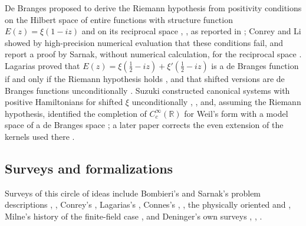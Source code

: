\documentclass[11pt]{amsart}
\theoremstyle{plain}
\theoremstyle{definition}
\theoremstyle{remark}
\numberwithin{equation}{section}
\newcommand{\R}{\mathbb{R}}
\begin{document}
De Branges proposed to derive the Riemann hypothesis from positivity
conditions on the Hilbert space of entire functions with structure
function $E(z)=\xi(1-iz)$ and on its reciprocal space
\cite{DeBranges1986RHHilbert}, \cite{DeBranges1992Euler}, as reported in
\cite[Theorem~2, p.~4]{ConreyLi2000Positivity}; Conrey and Li showed by
high-precision numerical evaluation that these conditions fail, and
report a proof by Sarnak, without numerical calculation, for the
reciprocal space \cite[(3.2) and~(3.4), pp.~6--7, and Remark, p.~9]%
{ConreyLi2000Positivity}. Lagarias proved that
$E(z)=\xi(\tfrac12-iz)+\xi'(\tfrac12-iz)$ is a de Branges function if
and only if the Riemann hypothesis holds
\cite[Theorem~1, p.~9]{Lagarias2006HilbertEntire}, and that shifted
versions are de Branges functions unconditionally
\cite[Theorem~2.1, p.~8]{Lagarias2005Differenced}. Suzuki constructed
canonical systems with positive Hamiltonians for shifted $\xi$
unconditionally \cite[Theorem~2.3, p.~8]{Suzuki2012Canonical},
\cite[Theorem~2.4, p.~9]{Suzuki2016Hamiltonians}, and, assuming the
Riemann hypothesis, identified the completion of $C_c^\infty(\R)$ for
Weil's form with a model space of a de Branges space
\cite[Theorem~1.1, p.~2]{Suzuki2023WeilHilbert}; a later paper
corrects the even extension of the kernels used there
\cite[p.~27]{Suzuki2026WeilScrew}.

\subsection{Surveys and formalizations}\label{subsec:prior-surveys}

Surveys of this circle of ideas include Bombieri's and Sarnak's
problem descriptions \cite{Bombieri2000Clay}, \cite{Sarnak2004Clay},
Conrey's \cite{Conrey2003Notices}, Lagarias's \cite{Lagarias2006Survey},
Connes's \cite{Connes2000Frontiers}, \cite{Connes2016EssayRH}, the
physically oriented \cite{BerryKeating1999SIAM} and
\cite{SchumayerHutchinson2011Physics}, Milne's history of the finite-field
case \cite{Milne2016RHFF}, and Deninger's own surveys
\cite{Deninger1998Analogies}, \cite{Deninger2001NumberTheory},
\cite{Deninger2008Foliated}.
\end{document}
